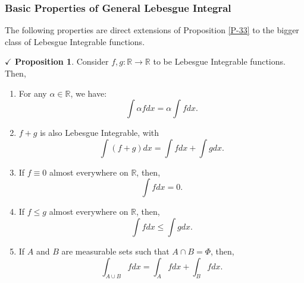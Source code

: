 \documentclass{article}
\theoremstyle{definition}
\theoremstyle{remark}
\theoremstyle{definition}
\theoremstyle{definition}
\newtheorem{proposition}{$\checkmark$ Proposition}
\theoremstyle{definition}
\newcommand{\union}{\cup}
\newcommand{\intrs}{\cap}
\newcommand{\R}{\mathbb{R}}
\begin{document}
\subsubsection{Basic Properties of General Lebesgue Integral}
The following properties are direct extensions of Proposition \ref{P-33} to the bigger class of Lebesgue Integrable functions.
\begin{proposition}\label{P-35}
	Consider $ f,g : \R\to \R $ to be Lebesgue Integrable functions. Then,
	\begin{enumerate}
		\item {For any $ \alpha \in \R $, we have:
	\[\int \alpha fdx = \alpha\int fdx.\]	
	}
\item {$ f + g $ is also Lebesgue Integrable, with
\[\int (f+g)dx = \int fdx + \int gdx.\]
}
\item {If $ f \equiv 0 $ almost everywhere on $ \R$, then,
\[\int fdx = 0.\]
}
\item {If $ f\le g $ almost everywhere on $ \R $, then,
\[\int fdx \le \int gdx.\]
}
\item {If $ A $ and $ B $ are measurable sets such that $ A\intrs B = \Phi $, then,
\[\int_{A\union B} fdx = \int_{A} fdx + \int_{B} fdx.\]
}
	\end{enumerate}
\end{proposition}
\end{document}
